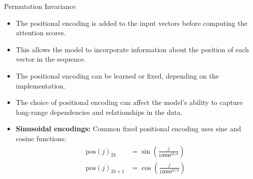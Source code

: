 \begin{frame}[allowframebreaks]{Permutation Invariance}
    \framebreak
    \begin{itemize}
        \item The positional encoding is added to the input vectors before computing the attention scores.
        \item This allows the model to incorporate information about the position of each vector in the sequence.
        \item The positional encoding can be learned or fixed, depending on the implementation.
        \item The choice of positional encoding can affect the model's ability to capture long-range dependencies and relationships in the data.
        \item \textbf{Sinusoidal encodings:} Common fixed positional encoding uses sine and cosine functions:
        \begin{align*}
            \mathrm{pos}(j)_{2k} &= \sin\left(\frac{j}{10000^{2k/d}}\right) \\
            \mathrm{pos}(j)_{2k+1} &= \cos\left(\frac{j}{10000^{2k/d}}\right)
        \end{align*}
    \end{itemize}
\end{frame}